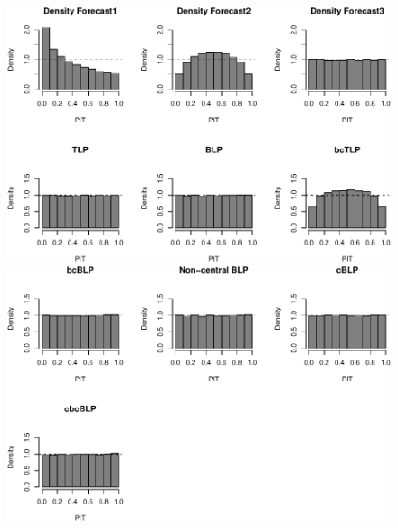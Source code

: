 \documentclass[]{article}
\begin{document}
\begin{figure}[H]

{\centering \includegraphics{Newest_BLPsim_files/figure-latex/unnamed-chunk-18-1} \includegraphics{Newest_BLPsim_files/figure-latex/unnamed-chunk-18-2} 

}

\end{figure}

\clearpage
\end{document}
